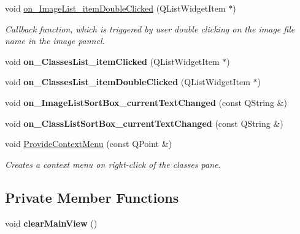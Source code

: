 \begin{DoxyCompactItemize}
\item 
void \hyperlink{classMainView_ae0af943bbf0d0806261bb8aa5444eb5b}{on\+\_\+\+Image\+List\+\_\+item\+Double\+Clicked} (Q\+List\+Widget\+Item $\ast$)
\begin{DoxyCompactList}\small\item\em Callback function, which is triggered by user double clicking on the image file name in the image pannel. \end{DoxyCompactList}\item 
\mbox{\label{classMainView_a2970c289fed50a4d86051135af81ba61}} 
void {\bfseries on\+\_\+\+Classes\+List\+\_\+item\+Clicked} (Q\+List\+Widget\+Item $\ast$)
\item 
\mbox{\label{classMainView_a53645de6ba66e27080df09fc7cbbf3d6}} 
void {\bfseries on\+\_\+\+Classes\+List\+\_\+item\+Double\+Clicked} (Q\+List\+Widget\+Item $\ast$)
\item 
\mbox{\label{classMainView_ab2b972e9dd92f3f3be8a7b4ac9380698}} 
void {\bfseries on\+\_\+\+Image\+List\+Sort\+Box\+\_\+current\+Text\+Changed} (const Q\+String \&)
\item 
\mbox{\label{classMainView_afb94b7f4f66f2c7f0bc841f9e95b4519}} 
void {\bfseries on\+\_\+\+Class\+List\+Sort\+Box\+\_\+current\+Text\+Changed} (const Q\+String \&)
\item 
void \hyperlink{classMainView_aa9d5f1300bd6b2524f611873d68c938b}{Provide\+Context\+Menu} (const Q\+Point \&)
\begin{DoxyCompactList}\small\item\em Creates a context menu on right-\/click of the classes pane. \end{DoxyCompactList}\end{DoxyCompactItemize}
\subsection*{Private Member Functions}
\begin{DoxyCompactItemize}
\item 
\mbox{\label{classMainView_a38e251a0a33b91a95157b24b105e75fb}} 
void {\bfseries clear\+Main\+View} ()
\end{DoxyCompactItemize}

